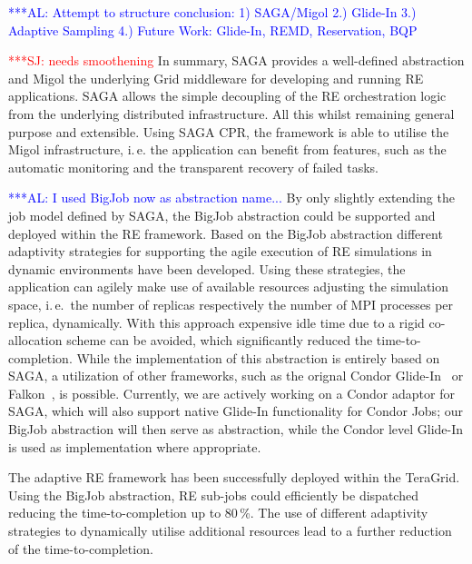 \documentclass{rspublic}
\newcommand{\alnote}[1]{ {\textcolor{blue} { ***AL: #1 }}}
\newcommand{\jhanote}[1]{ {\textcolor{red} { ***SJ: #1 }}}
\newcommand{\alnote}[1]{}
\newcommand{\jhanote}[1]{}
\begin{document}
                    
\alnote{Attempt to structure conclusion:
1) SAGA/Migol 2.) Glide-In 3.) Adaptive Sampling 4.) Future Work: Glide-In, REMD, Reservation, BQP}
                                         
\jhanote{needs smoothening} In summary, SAGA provides a well-defined abstraction 
and Migol the underlying Grid middleware for developing and running
RE applications.
SAGA allows the simple decoupling of the RE orchestration 
logic from the underlying distributed infrastructure. All this whilst remaining
general purpose and extensible. 
Using SAGA CPR, the framework is able to utilise the Migol infrastructure, 
i.\,e. the application can benefit from features, such as the automatic 
monitoring and the transparent recovery of failed tasks.  
                 
\alnote{I used BigJob now as abstraction name...}
By only slightly extending the job model defined by SAGA, the BigJob 
abstraction could be supported and deployed within the RE framework.  
Based on the BigJob abstraction different adaptivity strategies for supporting
the agile execution of RE simulations in dynamic environments have been
developed. Using these strategies, the application can agilely make use 
of available resources adjusting the simulation space, i.\,e.\ the number 
of replicas respectively the number of MPI processes per replica, dynamically. 
With this approach expensive idle time due to a rigid co-allocation 
scheme can be avoided, which significantly reduced the time-to-completion. 
While the implementation of this abstraction is entirely based
on SAGA, a utilization of other frameworks, such as the orignal Condor
Glide-In~\citep{citeulike:291860} or Falkon~\citep{1362680}, is
possible. Currently, we are actively working on a Condor adaptor for
SAGA, which will also support native Glide-In functionality for Condor
Jobs; our BigJob abstraction will then serve as abstraction, while the
Condor level Glide-In is used as implementation where appropriate.

The adaptive RE framework has been successfully deployed within 
the TeraGrid. 
Using the BigJob abstraction, RE sub-jobs could efficiently be dispatched 
reducing the time-to-completion up to 80\,\%. The use of different 
adaptivity strategies to dynamically utilise additional resources lead 
to a further reduction of the time-to-completion.
\end{document}
